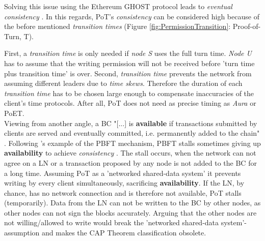 Solving this issue using the Ethereum GHOST protocol leads to \textit{eventual consistency} \cite[8]{Angelis.2018}.
In this regards, \gls{PoT}'s \textit{consistency} can be considered high because of the before mentioned \textit{transition times} (Figure \ref{fig:PermissionTransition}: Proof-of-Turn, T).
\begin{figure}
\end{figure}
First, a \textit{transition time} is only needed if \textit{node S} uses the full turn time.
\textit{Node U} has to assume that the writing permission will not be received before 'turn time plus transition time' is over.
Second, \textit{transition time} prevents the network from assuming different leaders due to \textit{time skews}.
Therefore the duration of each \textit{transition time} has to be chosen large enough to compensate inaccuracies of the client's time protocols.
After all, \gls{PoT} does not need as precise timing as \textit{Aura} or \gls{PoET}. \\
Viewing from another angle, a \gls{BC} "[...] is \textbf{available} if transactions submitted by clients are served and eventually committed, i.e. permanently added to the chain" \cite[7]{Angelis.2018}.
Following \citet{Angelis.2018}'s example of the \gls{PBFT} mechanism, \gls{PBFT} stalls sometimes giving up \textbf{availability} to achieve \textit{consistency} \cite[8]{Angelis.2018}.
The stall occurs, when the network can not agree on a \gls{LN} or a transaction proposed by any node is not added to the \gls{BC} for a long time.
Assuming \gls{PoT} as a 'networked shared-data system' it prevents writing by every client simultaneously, sacrificing \textbf{availability}.
If the \gls{LN}, by chance, has no network connection and is therefore not available, \gls{PoT} stalls (temporarily).
Data from the \gls{LN} can not be written to the \gls{BC} by other nodes, as other nodes can not sign the blocks accurately.
Arguing that the other nodes are not willing/allowed to write would break the 'networked shared-data system'-assumption and makes the CAP Theorem classification obsolete.
